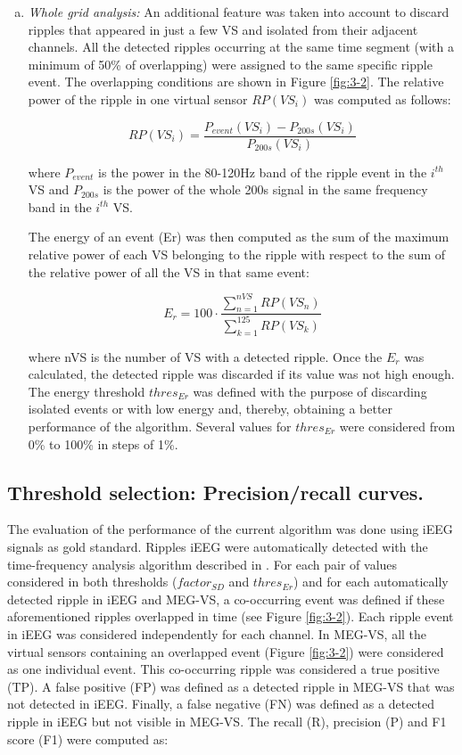 \begin{enumerate}[(a)]
\item \textit{Whole grid analysis:} An additional feature was taken into account to discard ripples that appeared in just a few VS and isolated from their adjacent channels. All the detected ripples occurring at the same time segment (with a minimum of 50\% of overlapping) were assigned to the same specific ripple event. The overlapping conditions are shown in Figure \ref{fig:3-2}. The relative power of the ripple in one virtual sensor $RP(VS_i)$ was computed as follows:

\begin{equation}
RP(VS_i)=\frac{P_{event}(VS_i)-P_{200s}(VS_i)}{P_{200s}(VS_i)}
\end{equation}

where $P_{event}$ is the power in the 80-120Hz band of the ripple event in the $i^{th}$ VS and $P_{200s}$ is the power of the whole 200s signal in the same frequency band in the $i^{th}$ VS. 

The energy of an event (Er) was then computed as the sum of the maximum relative power of each VS belonging to the ripple with respect to the sum of the relative power of all the VS in that same event:

\begin{equation}
E_r=100 \cdot \frac{\sum_{n=1}^{nVS} RP(VS_n)}{\sum_{k=1}^125 RP(VS_k)}
\end{equation}

where nVS is the number of VS with a detected ripple. Once the $E_r$ was calculated, the detected ripple was discarded if its value was not high enough. The energy threshold $thres_{Er}$ was defined with the purpose of discarding isolated events or with low energy and, thereby, obtaining a better performance of the algorithm. Several values for $thres_{Er}$ were considered from 0\% to 100\% in steps of 1\%.  
\end{enumerate}

\subsection{Threshold selection: Precision/recall curves.}
The evaluation of the performance of the current algorithm was done using iEEG signals as gold standard. Ripples iEEG were automatically detected with the time-frequency analysis algorithm described in \citep{Burnos2014}. For each pair of values considered in both thresholds ($factor_{SD}$ and $thres_{Er}$) and for each automatically detected ripple in iEEG and MEG-VS, a co-occurring event was defined if these aforementioned ripples overlapped in time (see Figure \ref{fig:3-2}). Each ripple event in iEEG was considered independently for each channel. In MEG-VS, all the virtual sensors containing an overlapped event (Figure \ref{fig:3-2}) were considered as one individual event. This co-occurring ripple was considered a true positive (TP). A false positive (FP) was defined as a detected ripple in MEG-VS that was not detected in iEEG. Finally, a false negative (FN) was defined as a detected ripple in iEEG but not visible in MEG-VS. The recall (R), precision (P) and F1 score (F1) were computed as:

